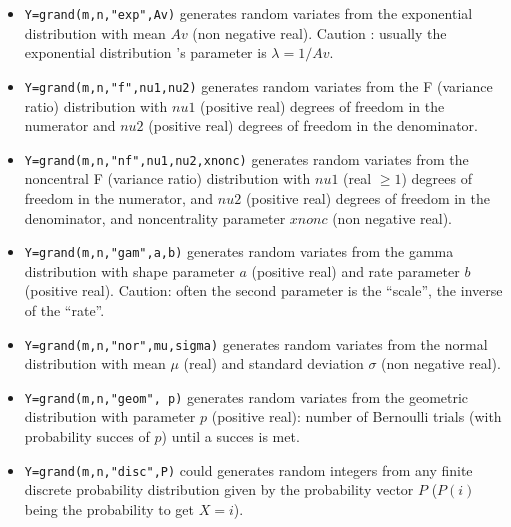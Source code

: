 \begin{description}
\begin{itemize}
\item {} \verb!Y=grand(m,n,"exp",Av)! generates random variates from the exponential
  distribution with mean $Av$ (non negative real). Caution : usually
  the exponential distribution 's parameter is $\lambda= 1/Av$.  
  
\item {} 
  \verb!Y=grand(m,n,"f",nu1,nu2)! generates random variates from the F 
  (variance ratio) distribution with $nu1$ (positive real)
  degrees of freedom in the numerator and $nu2$ (positive real) 
  degrees of freedom in the denominator. 
  
\item {} 
  \verb!Y=grand(m,n,"nf",nu1,nu2,xnonc)! generates random variates from the noncentral 
  F (variance ratio)  distribution with $nu1$ (real $\ge 1$) degrees of freedom 
  in the numerator, and $nu2$ (positive real) degrees of freedom in the denominator, 
  and noncentrality parameter $xnonc$ (non negative real). 
  
\item {} \verb!Y=grand(m,n,"gam",a,b)! generates random variates from the gamma 
  distribution with shape parameter $a$ (positive real) and rate
  parameter $b$ (positive real). Caution: often the second parameter
  is the ``scale'', the inverse of the ``rate''.  
  
\item {} 
  \verb!Y=grand(m,n,"nor",mu,sigma)! generates random variates from the normal 
  distribution with mean $\mu$ (real)  and standard deviation $\sigma$
  (non negative real). 
  
\item {} \verb!Y=grand(m,n,"geom", p)! generates random variates from the geometric
  distribution with parameter $p$ (positive real): number of Bernoulli trials (with 
  probability succes of $p$) until a succes is met.

\item {} 
  \verb!Y=grand(m,n,"disc",P)! could generates random integers from any
  finite discrete probability distribution given by the probability
  vector $P$ ($P(i)$ being the probability to get $X=i$).
  

\end{itemize}
\end{description}
